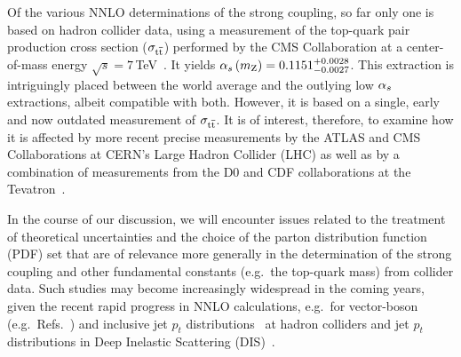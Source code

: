 Of the various NNLO determinations of the strong coupling, so far only one is
based on hadron collider data, using a measurement of the top-quark
pair production cross section ($\sigma_{\mathrm{t}\overline{\mathrm{t}}}$) performed by the CMS
Collaboration at a center-of-mass energy
$\sqrt{s}=7\,$TeV~\cite{Chatrchyan:2013haa}.
%
It yields $\alpha_s \left( m_\mathrm{Z} \right)  = 0.1151^{+0.0028}_{-0.0027}$.
%
This extraction is intriguingly placed between the world average and
the outlying low $\alpha_s$ extractions, albeit compatible with both.
%
However, it is based on a single, early and now outdated measurement of $\sigma_{\mathrm{t}\overline{\mathrm{t}}}$.
%
It is of interest, therefore, to examine how it is affected by more
recent precise measurements by the ATLAS and CMS Collaborations at
CERN's Large Hadron Collider (LHC)
\cite{Khachatryan:2016mqs,Khachatryan:2015uqb,Sirunyan:2017uhy,Aad:2014kva,Aaboud:2016pbd}
as well as by a combination of measurements from the D0 and CDF
collaborations at the Tevatron~\cite{Aaltonen:2013wca}.

In the course of our discussion, we will encounter issues related to
the treatment of theoretical uncertainties and the choice of the
parton distribution function (PDF) set
that are of relevance more generally in the determination of the
strong coupling and other fundamental constants (e.g.\ the top-quark
mass) from collider data.
%
Such studies may become increasingly widespread in the coming
years, given the recent rapid progress in NNLO calculations, e.g.\ for
vector-boson (e.g.\ Refs.~\cite{Boughezal:2015ded,Ridder:2016nkl}) and
inclusive jet $p_t$ 
distributions~\cite{Currie:2017tfd} at hadron colliders and jet $p_t$
distributions in Deep Inelastic Scattering (DIS)~\cite{Currie:2017tpe}.
